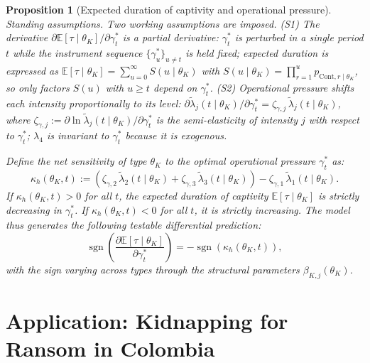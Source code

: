 \documentclass[review,authoryear,12pt]{elsarticle}
\theoremstyle{plain}
\newtheorem{proposition}[theorem]{Proposition}
\theoremstyle{definition}
\newcommand{\1}{\mathbf{1}}
\begin{document}
\begin{proposition}[Expected duration of captivity and operational pressure]
\label{prop:expected-captivity-gamma}
\noindent\textit{Standing assumptions.} Two working assumptions are imposed. \textup{(S1)} The derivative $\partial\mathbb{E}[\tau\mid\theta_K]/\partial\gamma_t^\ast$ is a partial derivative: $\gamma_t^\ast$ is perturbed in a single period $t$ while the instrument sequence $\{\gamma_u^\ast\}_{u\neq t}$ is held fixed; expected duration is expressed as $\mathbb{E}[\tau\mid\theta_K]=\sum_{u=0}^{\infty}S(u\mid\theta_K)$ with $S(u\mid\theta_K)=\prod_{r=1}^{u}p_{\mathrm{Cont},r\mid\theta_K}$, so only factors $S(u)$ with $u\geq t$ depend on $\gamma_t^\ast$. \textup{(S2)} Operational pressure shifts each intensity proportionally to its level: $\partial\tilde{\lambda}_j(t\mid\theta_K)/\partial\gamma_t^\ast=\zeta_{\gamma,j}\,\tilde{\lambda}_j(t\mid\theta_K)$, where $\zeta_{\gamma,j}:=\partial\ln\tilde{\lambda}_j(t\mid\theta_K)/\partial\gamma_t^\ast$ is the semi-elasticity of intensity $j$ with respect to $\gamma_t^\ast$; $\lambda_4$ is invariant to $\gamma_t^\ast$ because it is exogenous.

\medskip
Define the net sensitivity of type $\theta_K$ to the optimal operational pressure $\gamma_t^\ast$ as:
\begin{equation}
\label{eq:kappa-c}
\kappa_h(\theta_K, t) := \left( \zeta_{\gamma,2}\, \tilde{\lambda}_2(t \mid \theta_K) + \zeta_{\gamma,3}\, \tilde{\lambda}_3(t \mid \theta_K) \right) - \zeta_{\gamma,1}\, \tilde{\lambda}_1(t \mid \theta_K).
\end{equation}
If $\kappa_h(\theta_K, t) > 0$ for all $t$, the expected duration of captivity $\mathbb{E}[\tau \mid \theta_K]$ is strictly decreasing in $\gamma_t^\ast$. If $\kappa_h(\theta_K, t) < 0$ for all $t$, it is strictly increasing. The model thus generates the following testable differential prediction:
\begin{equation}
\operatorname{sgn} \left( \frac{\partial \mathbb{E}[\tau \mid \theta_K]}{\partial \gamma_t^\ast} \right) = - \operatorname{sgn}(\kappa_h(\theta_K, t)),
\end{equation}
with the sign varying across types through the structural parameters $\beta_{K,j}(\theta_K)$.
\end{proposition}

\section{Application: Kidnapping for Ransom in Colombia}\label{sec:application}
\end{document}
